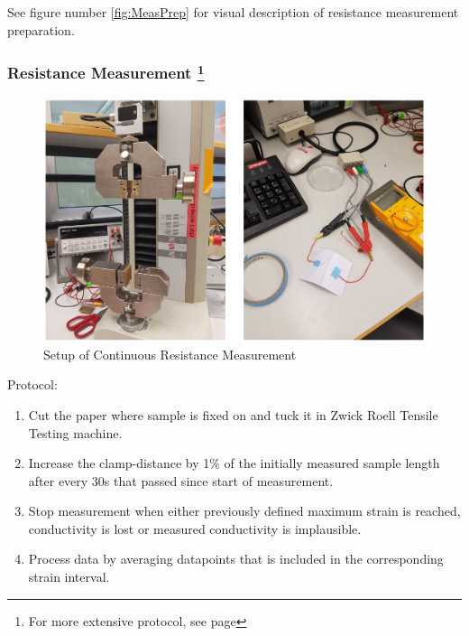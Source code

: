     \begin{center}
    
See figure number \ref{fig:MeasPrep} for visual description of resistance measurement preparation.
    \end{center}


\subsubsection[Resistance Measurement]{Resistance Measurement \label{subsec:ResMeas} \footnote{For more extensive protocol, see page \pageref{App:ResMeas}}}

\begin{figure}[H]
    \centerline{\includegraphics[scale=0.7]{./pic/MethodsResMeasurement.PNG}}
    \caption{Setup of Continuous Resistance Measurement}
    \label{fig:ContResMeas}
\end{figure}

Protocol:

\begin{enumerate}
	\item Cut the paper where sample is fixed on and tuck it in Zwick Roell Tensile Testing machine. 
	
	\item Increase the clamp-distance by 1\% of the initially measured sample length after every 30s that passed since start of measurement. 
	
	\item Stop measurement when either previously defined maximum strain is reached, conductivity is lost or measured conductivity is implausible.
	
	\item Process data by averaging datapoints that is included in the corresponding strain interval.

\end{enumerate}

